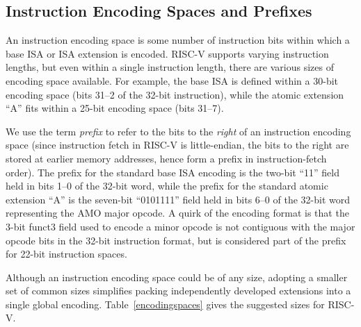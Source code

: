 \vspace{-0.2in}
\subsection*{Instruction Encoding Spaces and Prefixes}

An instruction encoding space is some number of instruction bits
within which a base ISA or ISA extension is encoded.  RISC-V supports
varying instruction lengths, but even within a single instruction
length, there are various sizes of encoding space available.  For
example, the base ISA is defined within a 30-bit encoding space (bits
31--2 of the 32-bit instruction), while the atomic extension ``A''
fits within a 25-bit encoding space (bits 31--7).

We use the term {\em prefix} to refer to the bits to the {\em right}
of an instruction encoding space (since instruction fetch in RISC-V is
little-endian, the
bits to the right are stored at earlier memory addresses, hence form a
prefix in instruction-fetch order).  The prefix for the standard base
ISA encoding is the two-bit ``11'' field held in bits 1--0 of the
32-bit word, while the prefix for the standard atomic extension ``A''
is the seven-bit ``0101111'' field held in bits 6--0 of the 32-bit
word representing the AMO major opcode.  A quirk of the encoding
format is that the 3-bit funct3 field used to encode a minor opcode is
not contiguous with the major opcode bits in the 32-bit instruction
format, but is considered part of the prefix for 22-bit instruction
spaces.

Although an instruction encoding space could be of any size, adopting
a smaller set of common sizes simplifies packing independently
developed extensions into a single global encoding.
Table~\ref{encodingspaces} gives the suggested sizes for RISC-V.

